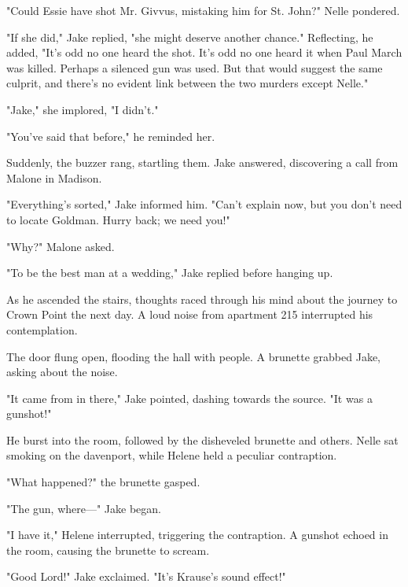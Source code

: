 \documentclass{novel}
\begin{document}
"Could Essie have shot Mr. Givvus, mistaking him for St. John?" Nelle pondered.

"If she did," Jake replied, "she might deserve another chance." Reflecting, he added, "It's odd no one heard the shot. It's odd no one heard it when Paul March was killed. Perhaps a silenced gun was used. But that would suggest the same culprit, and there's no evident link between the two murders except Nelle."

"Jake," she implored, "I didn't."

"You've said that before," he reminded her.

Suddenly, the buzzer rang, startling them. Jake answered, discovering a call from Malone in Madison.

"Everything's sorted," Jake informed him. "Can't explain now, but you don't need to locate Goldman. Hurry back; we need you!"

"Why?" Malone asked.

"To be the best man at a wedding," Jake replied before hanging up.

As he ascended the stairs, thoughts raced through his mind about the journey to Crown Point the next day. A loud noise from apartment 215 interrupted his contemplation.

The door flung open, flooding the hall with people. A brunette grabbed Jake, asking about the noise.

"It came from in there," Jake pointed, dashing towards the source. "It was a gunshot!"

\begin{ChapterStart}
\vspace{3\nbs}
\end{ChapterStart}

He burst into the room, followed by the disheveled brunette and others. Nelle sat smoking on the davenport, while Helene held a peculiar contraption.

"What happened?" the brunette gasped.

"The gun, where—" Jake began.

"I have it," Helene interrupted, triggering the contraption. A gunshot echoed in the room, causing the brunette to scream.

"Good Lord!" Jake exclaimed. "It's Krause's sound effect!"
\end{document}
